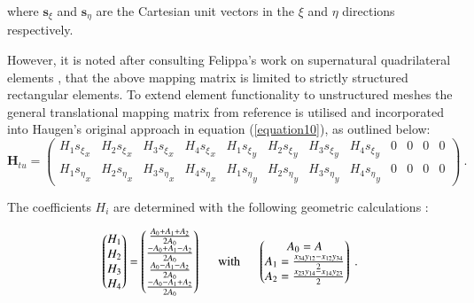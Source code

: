 where $\mathbf{s}_\xi$ and $\mathbf{s}_\eta$ are the Cartesian unit vectors in the $\xi$ and $\eta$ directions respectively.

However, it is noted after consulting Felippa's work on supernatural quadrilateral elements \cite{felippa2006supernatural}, that the above mapping matrix is limited to strictly structured rectangular elements. To extend element functionality to unstructured meshes the general translational mapping matrix from reference \cite{felippa2006supernatural} is utilised and incorporated into Haugen's original approach in equation (\ref{equation10}), as outlined below:
\begin{equation} 
\mathbf{H}_{tu} =
\begin{pmatrix}
H_1{s_\xi}_x & H_2{s_\xi}_x & H_3{s_\xi}_x & H_4{s_\xi}_x & H_1{s_\xi}_y & H_2{s_\xi}_y & H_3{s_\xi}_y & H_4{s_\xi}_y & 0 & 0 & 0 & 0 \\
H_1{s_\eta}_x & H_2{s_\eta}_x & H_3{s_\eta}_x & H_4{s_\eta}_x & H_1{s_\eta}_y & H_2{s_\eta}_y & H_3{s_\eta}_y & H_4{s_\eta}_y & 0 & 0 & 0 & 0
\end{pmatrix}
\label{equation10_1}\ .
\end{equation}

The coefficients $H_i$ are determined with the following geometric calculations \cite{felippa2006supernatural}:

\begin{equation} 
\begin{pmatrix}
H_1 \\
H_2 \\
H_3 \\
H_4
\end{pmatrix}
=
\begin{pmatrix}
\frac{A_0 + A_1 + A_2}{2A_0} \\
\frac{-A_0 + A_1 - A_2}{2A_0} \\
\frac{A_0 - A_1 - A_2}{2A_0} \\
\frac{-A_0 - A_1 + A_2}{2A_0}
\end{pmatrix}
\hspace{5mm}
\text{with}
\hspace{5mm}
\begin{pmatrix}
A_0 = A \\
A_1 = \frac{x_{34} y_{12} - x_{12} y_{34}}{2} \\
A_2 = \frac{x_{23} y_{14} - x_{14} y_{23}}{2}
\end{pmatrix}
\label{equation10_2}\ .
\end{equation}

